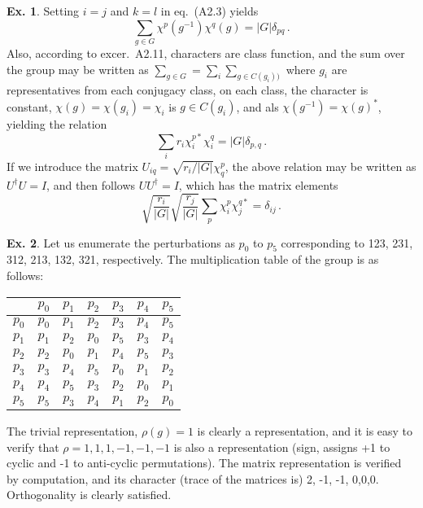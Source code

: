 \documentclass[a4paper,12pt]{article}
\theoremstyle{definition}
\newtheorem{exercise}{Ex.}[section]
\begin{document}
\begin{exercise}
 Setting $i=j$ and $k=l$ in eq.\ (A2.3) yields
 \[
  \sum_{g\in G} \chi^p(g^{-1})\chi^q(g) = |G|  \delta_{pq}\,.
 \]
 Also, according to excer.\ A2.11, characters are class function, and the sum over the group may be written as $\sum_{g\in G} = \sum_i \sum_{g\in C(g_i))}$ where $g_i$ are representatives from each conjugacy class, on each class, the character is constant, $\chi(g) = \chi(g_i)=\chi_i$ is $g\in C(g_i)$, and als $\chi(g^{-1})=\chi(g)^*$, yielding the relation
 \[
  \sum_i r_i \chi_i^{p*} \chi_i^q = |G|\delta_{p,q}\,.
 \]
 If we introduce the matrix $U_{iq} = \sqrt{r_i/|G|}\chi^p_q$, the above relation may be written as $U^\dagger U = I$, and then follows $UU^\dagger=I$, which has the matrix elements
 \[
  \sqrt{\frac{r_i}{|G|}}\sqrt{\frac{r_j}{|G|}} \sum_p \chi_i^p \chi_j^{q*} = \delta_{ij}\,.
 \]

\end{exercise}

\begin{exercise}
 Let us enumerate the perturbations as $p_0$ to $p_5$ corresponding to 123, 231, 312, 213, 132, 321, respectively. The multiplication table of the group is as follows:
 \begin{center}
  \begin{tabular}{c||c|c|c|c|c|c}
         & $p_0$ & $p_1$ & $p_2$ & $p_3$ & $p_4$ & $p_5$ \\
   \hline\hline
   $p_0$ & $p_0$ & $p_1$ & $p_2$ & $p_3$ & $p_4$ & $p_5$ \\
   $p_1$ & $p_1$ & $p_2$ & $p_0$ & $p_5$ & $p_3$ & $p_4$ \\
   $p_2$ & $p_2$ & $p_0$ & $p_1$ & $p_4$ & $p_5$ & $p_3$ \\
   $p_3$ & $p_3$ & $p_4$ & $p_5$ & $p_0$ & $p_1$ & $p_2$ \\
   $p_4$ & $p_4$ & $p_5$ & $p_3$ & $p_2$ & $p_0$ & $p_1$ \\
   $p_5$ & $p_5$ & $p_3$ & $p_4$ & $p_1$ & $p_2$ & $p_0$ \\
  \end{tabular}
 \end{center}
 The trivial representation, $\rho(g)=1$ is clearly a representation, and it is easy to verify that $\rho = 1,1,1,-1,-1,-1$ is also a representation (sign, assigns +1 to cyclic and -1 to anti-cyclic permutations). The matrix representation is verified by computation, and its character (trace of the matrices is) 2, -1, -1, 0,0,0. Orthogonality is clearly satisfied.
\end{exercise}
\end{document}
